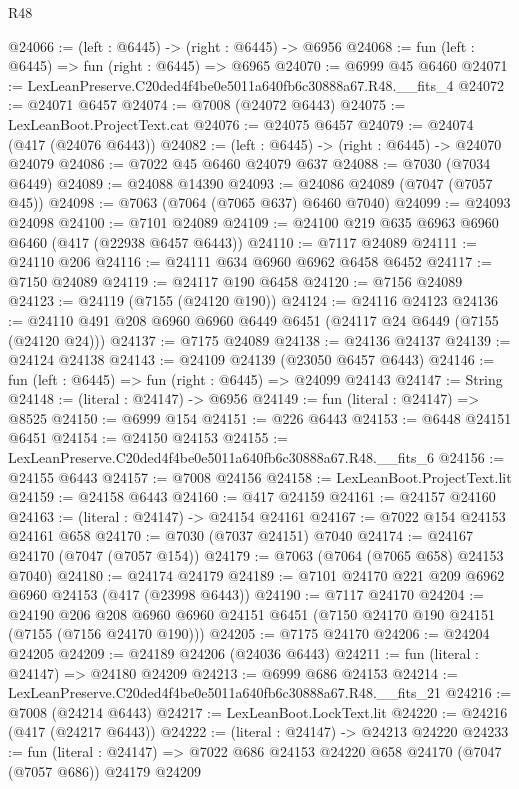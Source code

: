 \begin{lexlean}{R48}
\begin{coremodule}
@24066 := (left : @6445) -> (right : @6445) -> @6956
@24068 := fun (left : @6445) => fun (right : @6445) => @6965
@24070 := @6999 @45 @6460
@24071 := LexLeanPreserve.C20ded4f4be0e5011a640fb6c30888a67.R48.__fits_4
@24072 := @24071 @6457
@24074 := @7008 (@24072 @6443)
@24075 := LexLeanBoot.ProjectText.cat
@24076 := @24075 @6457
@24079 := @24074 (@417 (@24076 @6443))
@24082 := (left : @6445) -> (right : @6445) -> @24070 @24079
@24086 := @7022 @45 @6460 @24079 @637
@24088 := @7030 (@7034 @6449)
@24089 := @24088 @14390
@24093 := @24086 @24089 (@7047 (@7057 @45))
@24098 := @7063 (@7064 (@7065 @637) @6460 @7040)
@24099 := @24093 @24098
@24100 := @7101 @24089
@24109 := @24100 @219 @635 @6963 @6960 @6460 (@417 (@22938 @6457 @6443))
@24110 := @7117 @24089
@24111 := @24110 @206
@24116 := @24111 @634 @6960 @6962 @6458 @6452
@24117 := @7150 @24089
@24119 := @24117 @190 @6458
@24120 := @7156 @24089
@24123 := @24119 (@7155 (@24120 @190))
@24124 := @24116 @24123
@24136 := @24110 @491 @208 @6960 @6960 @6449 @6451 (@24117 @24 @6449 (@7155 (@24120 @24)))
@24137 := @7175 @24089
@24138 := @24136 @24137
@24139 := @24124 @24138
@24143 := @24109 @24139 (@23050 @6457 @6443)
@24146 := fun (left : @6445) => fun (right : @6445) => @24099 @24143
@24147 := String
@24148 := (literal : @24147) -> @6956
@24149 := fun (literal : @24147) => @8525
@24150 := @6999 @154
@24151 := @226 @6443
@24153 := @6448 @24151 @6451
@24154 := @24150 @24153
@24155 := LexLeanPreserve.C20ded4f4be0e5011a640fb6c30888a67.R48.__fits_6
@24156 := @24155 @6443
@24157 := @7008 @24156
@24158 := LexLeanBoot.ProjectText.lit
@24159 := @24158 @6443
@24160 := @417 @24159
@24161 := @24157 @24160
@24163 := (literal : @24147) -> @24154 @24161
@24167 := @7022 @154 @24153 @24161 @658
@24170 := @7030 (@7037 @24151) @7040
@24174 := @24167 @24170 (@7047 (@7057 @154))
@24179 := @7063 (@7064 (@7065 @658) @24153 @7040)
@24180 := @24174 @24179
@24189 := @7101 @24170 @221 @209 @6962 @6960 @24153 (@417 (@23998 @6443))
@24190 := @7117 @24170
@24204 := @24190
    @206
    @208
    @6960
    @6960
    @24151
    @6451
    (@7150 @24170 @190 @24151 (@7155 (@7156 @24170 @190)))
@24205 := @7175 @24170
@24206 := @24204 @24205
@24209 := @24189 @24206 (@24036 @6443)
@24211 := fun (literal : @24147) => @24180 @24209
@24213 := @6999 @686 @24153
@24214 := LexLeanPreserve.C20ded4f4be0e5011a640fb6c30888a67.R48.__fits_21
@24216 := @7008 (@24214 @6443)
@24217 := LexLeanBoot.LockText.lit
@24220 := @24216 (@417 (@24217 @6443))
@24222 := (literal : @24147) -> @24213 @24220
@24233 := fun (literal : @24147) =>
  @7022 @686 @24153 @24220 @658 @24170 (@7047 (@7057 @686)) @24179 @24209

\end{coremodule}
\end{lexlean}

